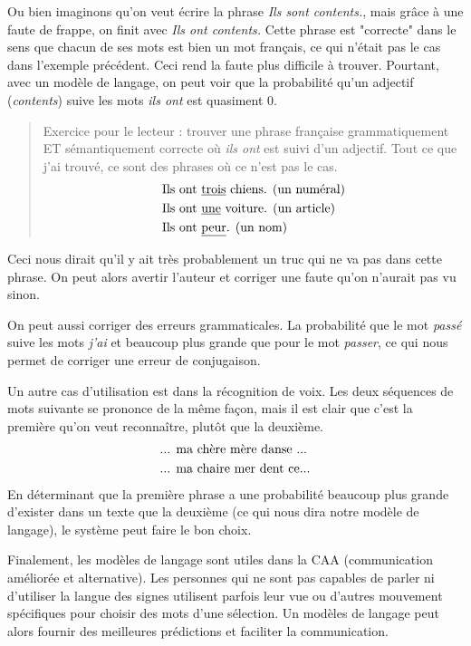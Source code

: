 \documentclass[11pt, a4paper]{report}
\begin{document}
  Ou bien imaginons qu'on veut écrire 
  la phrase \textit{Ils sont contents.}, mais grâce à une faute de frappe, on finit avec 
  \textit{Ils ont contents.} Cette phrase est "correcte" dans le sens que chacun de ses mots 
  est bien un mot français, ce qui n'était pas le cas dans l'exemple précédent.
  Ceci rend la faute plus difficile à trouver. Pourtant, avec un modèle de langage, 
  on peut voir que la probabilité qu'un adjectif (\textit{contents}) suive 
  les mots \textit{ils ont} est quasiment 0. 
  \begin{quote}
    Exercice pour le lecteur : trouver une phrase 
    française grammatiquement ET sémantiquement correcte où \textit{ils ont} est suivi d'un 
    adjectif. Tout ce que j'ai trouvé, ce sont des phrases où ce n'est pas le cas. 
    \begin{align*}
      &\textup{Ils ont \underline{trois} chiens. (un numéral)}\\
      &\textup{Ils ont \underline{une} voiture. (un article)}\\
      &\textup{Ils ont \underline{peur}. (un nom)}
    \end{align*}
  \end{quote} 
  Ceci nous dirait qu'il y ait très probablement un truc qui ne va pas dans cette phrase. 
  On peut alors avertir l'auteur et corriger une faute qu'on n'aurait pas vu sinon. 

  On peut aussi corriger des erreurs grammaticales. La probabilité que le mot 
  \textit{passé} suive les mots \textit{j'ai} et beaucoup plus grande que 
  pour le mot \textit{passer}, ce qui nous permet de corriger une erreur de conjugaison. 
  

  Un autre cas d'utilisation est dans la récognition de voix. Les deux séquences de mots
  suivante se prononce de la même façon, mais il est clair que c'est la première qu'on veut 
  reconnaître, plutôt que la deuxième. 
  \begin{align*}
    &\textup{... ma chère mère danse ...}\\
    &\textup{... ma chaire mer dent ce}...\\
  \end{align*}
  En déterminant que la première phrase a une probabilité beaucoup plus grande d'exister 
  dans un texte que la deuxième (ce qui nous dira notre modèle de langage), 
  le système peut faire le bon choix. 

  Finalement, les modèles de langage sont utiles dans la CAA (communication améliorée et 
  alternative). Les personnes qui ne sont pas capables de parler ni d'utiliser la langue des 
  signes utilisent parfois leur vue ou d'autres mouvement spécifiques pour choisir des mots 
  d'une sélection. Un modèles de langage peut alors fournir des meilleures prédictions et 
  faciliter la communication. 
\end{document}
